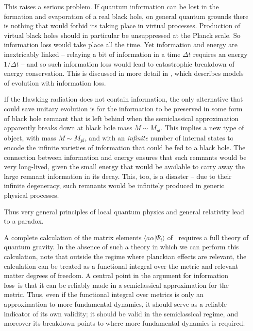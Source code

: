 This raises a serious problem.  If quantum information can be lost in the formation and evaporation of a real black hole, on general quantum grounds there is  nothing that would forbid its taking place in virtual processes.  Production of virtual black holes should in particular be unsuppressed at the Planck scale.  So information loss would take place all the time.  Yet information and energy are inextricably linked -- relaying a bit of information in a time $\Delta t$ requires an energy $1/\Delta t$ -- and so such information loss would lead to catastrophic breakdown of energy conservation.  This is discussed in more detail in , which describes models of evolution with information loss.

If the Hawking radiation does not contain information, the only alternative that could save unitary evolution is for the information to be preserved in some form of black hole remnant that is left behind when the semiclassical approximation apparently breaks down at black hole mass $M\sim M_{pl}$.  This implies a new type of object, with mass $M\sim M_{pl}$, and with an {\it infinite} number of internal states to encode the infinite varieties of information that could be fed to a black hole.  The connection between information and energy ensures that such remnants would be very long-lived, given the small energy that would be available to carry away the large remnant information in its decay.
This, too, is a disaster -- due to their infinite degeneracy, such remnants would be infinitely produced in generic physical processes.

Thus very general principles of local quantum physics and general relativity lead to a paradox.



A complete calculation of the matrix elements $\langle a\alpha |\Psi_i\rangle$ of \Hawkstate\ requires a full theory of quantum gravity.  In the absence of such a theory in which we can perform this calculation, note that outside the regime where planckian effects are relevant, the calculation can be treated as a functional integral over the metric and relevant matter degrees of freedom.  A central point in the argument for information loss\Hawkunc\  is that it can be reliably made in a semiclassical approximation for the metric.  Thus, even if the functional integral over metrics is only an approximation to more fundamental dynamics, it should serve as a reliable indicator of its own validity; it should be valid in the semiclassical regime, and moreover its breakdown points to where more fundamental dynamics is required.

